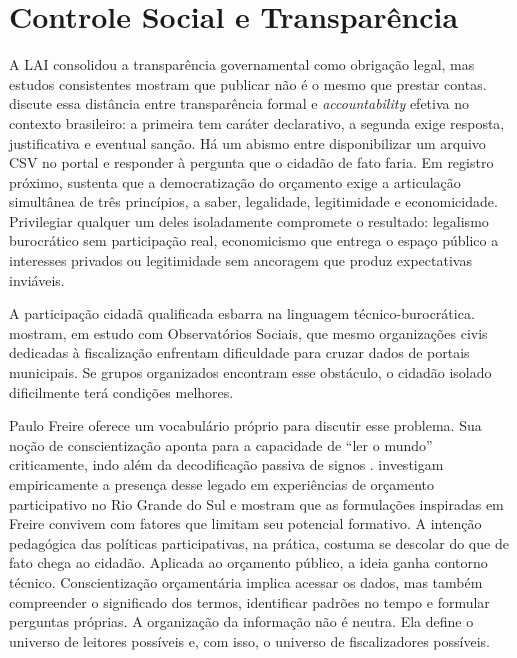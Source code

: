 \section{Controle Social e Transparência}

A LAI consolidou a transparência governamental como obrigação legal, mas estudos consistentes mostram que publicar não é o mesmo que prestar contas.  discute essa distância entre transparência formal e \textit{accountability} efetiva no contexto brasileiro: a primeira tem caráter declarativo, a segunda exige resposta, justificativa e eventual sanção. Há um abismo entre disponibilizar um arquivo CSV no portal e responder à pergunta que o cidadão de fato faria. Em registro próximo,  sustenta que a democratização do orçamento exige a articulação simultânea de três princípios, a saber, legalidade, legitimidade e economicidade. Privilegiar qualquer um deles isoladamente compromete o resultado: legalismo burocrático sem participação real, economicismo que entrega o espaço público a interesses privados ou legitimidade sem ancoragem que produz expectativas inviáveis.

A participação cidadã qualificada esbarra na linguagem técnico-burocrática.  mostram, em estudo com Observatórios Sociais, que mesmo organizações civis dedicadas à fiscalização enfrentam dificuldade para cruzar dados de portais municipais. Se grupos organizados encontram esse obstáculo, o cidadão isolado dificilmente terá condições melhores.

Paulo Freire oferece um vocabulário próprio para discutir esse problema. Sua noção de conscientização aponta para a capacidade de ``ler o mundo'' criticamente, indo além da decodificação passiva de signos \cite{freire1967liberdade,freire1996autonomia}.  investigam empiricamente a presença desse legado em experiências de orçamento participativo no Rio Grande do Sul e mostram que as formulações inspiradas em Freire convivem com fatores que limitam seu potencial formativo. A intenção pedagógica das políticas participativas, na prática, costuma se descolar do que de fato chega ao cidadão. Aplicada ao orçamento público, a ideia ganha contorno técnico. Conscientização orçamentária implica acessar os dados, mas também compreender o significado dos termos, identificar padrões no tempo e formular perguntas próprias. A organização da informação não é neutra. Ela define o universo de leitores possíveis e, com isso, o universo de fiscalizadores possíveis.

